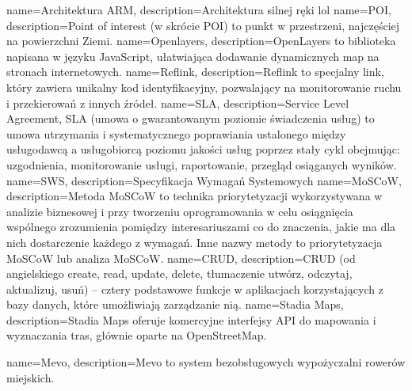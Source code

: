 {
    name={Architektura ARM},
    description={Architektura silnej ręki lol}
}
{
    name={POI},
    description={Point of interest (w skrócie POI) to punkt w przestrzeni, najczęściej na powierzchni Ziemi.}
}
{
    name={Openlayers},
    description={OpenLayers to biblioteka napisana w języku JavaScript, ułatwiająca dodawanie dynamicznych map na stronach internetowych.}
}
{
    name={Reflink},
    description={Reflink to specjalny link, który zawiera unikalny kod identyfikacyjny, pozwalający na monitorowanie ruchu i przekierowań z innych źródeł.}
}
{
    name={SLA},
    description={Service Level Agreement, SLA (umowa o gwarantowanym poziomie świadczenia usług) to umowa utrzymania i systematycznego poprawiania ustalonego między usługodawcą a usługobiorcą poziomu jakości usług poprzez stały cykl obejmując: uzgodnienia,
    monitorowanie usługi, raportowanie, przegląd osiąganych wyników.}
}
{
    name={SWS},
    description={Specyfikacja Wymagań Systemowych }
}
{
    name={MoSCoW},
    description={Metoda MoSCoW to technika priorytetyzacji wykorzystywana w analizie biznesowej i przy tworzeniu oprogramowania w celu osiągnięcia wspólnego zrozumienia pomiędzy interesariuszami co do znaczenia, jakie ma dla nich dostarczenie każdego z wymagań. Inne nazwy metody to priorytetyzacja MoSCoW lub analiza MoSCoW.}
}
{
    name={CRUD},
    description={CRUD (od angielskiego create, read, update, delete, tłumaczenie utwórz, odczytaj, aktualizuj, usuń) – cztery podstawowe funkcje w aplikacjach korzystających z bazy danych, które umożliwiają zarządzanie nią.}
}
{
    name={Stadia Maps},
    description={Stadia Maps oferuje komercyjne interfejsy API do mapowania i wyznaczania tras, głównie oparte na OpenStreetMap.}
}

{
    name={Mevo},
    description={Mevo to system bezobsługowych wypożyczalni rowerów miejskich.}
}